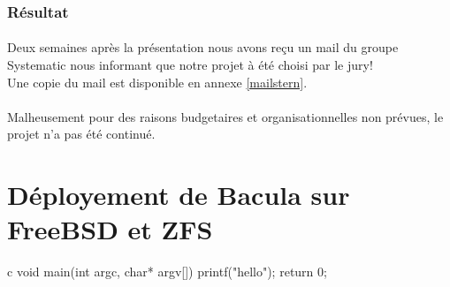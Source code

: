 \subsubsection{Résultat}
\paragraph*{}
Deux semaines après la présentation nous avons reçu un mail du groupe Systematic nous informant que notre projet à été choisi par le jury!\\
Une copie du mail est disponible en annexe \ref{mailstern}.

\paragraph*{}
Malheusement pour des raisons budgetaires et organisationnelles non prévues, le projet n'a pas été continué.

\section{Déployement de Bacula sur FreeBSD et ZFS}

\begin{pygmented}{c}
void main(int argc, char* argv[])
{
	printf("hello");
	return 0;
}
\end{pygmented}



\cite{test}
